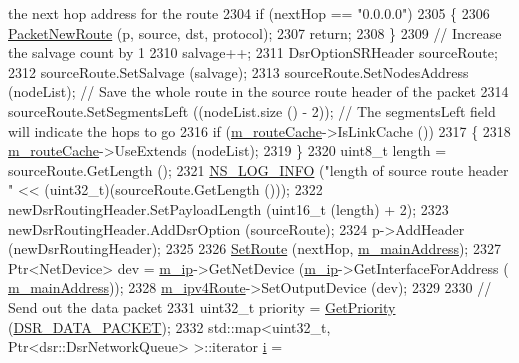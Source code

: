 \begin{DoxyCode}
{       the next hop address for the route}
2304       \textcolor{keywordflow}{if} (nextHop == \textcolor{stringliteral}{"0.0.0.0"})
2305         \{
2306           \hyperlink{classns3_1_1dsr_1_1DsrRouting_ae70ab39db551d1d81afc081196f78017}{PacketNewRoute} (p, source, dst, protocol);
2307           \textcolor{keywordflow}{return};
2308         \}
2309       \textcolor{comment}{// Increase the salvage count by 1}
2310       salvage++;
2311       DsrOptionSRHeader sourceRoute;
2312       sourceRoute.SetSalvage (salvage);
2313       sourceRoute.SetNodesAddress (nodeList);     \textcolor{comment}{// Save the whole route in the source route header of the
       packet}
2314       sourceRoute.SetSegmentsLeft ((nodeList.size () - 2));     \textcolor{comment}{// The segmentsLeft field will indicate the
       hops to go}
2316 \textcolor{comment}{}      \textcolor{keywordflow}{if} (\hyperlink{classns3_1_1dsr_1_1DsrRouting_ac409bdb961b9fff0fb63ebd026be99ad}{m\_routeCache}->IsLinkCache ())
2317         \{
2318           \hyperlink{classns3_1_1dsr_1_1DsrRouting_ac409bdb961b9fff0fb63ebd026be99ad}{m\_routeCache}->UseExtends (nodeList);
2319         \}
2320       uint8\_t length = sourceRoute.GetLength ();
2321       \hyperlink{group__logging_gafbd73ee2cf9f26b319f49086d8e860fb}{NS\_LOG\_INFO} (\textcolor{stringliteral}{"length of source route header "} << (uint32\_t)(sourceRoute.GetLength ()));
2322       newDsrRoutingHeader.SetPayloadLength (uint16\_t (length) + 2);
2323       newDsrRoutingHeader.AddDsrOption (sourceRoute);
2324       p->AddHeader (newDsrRoutingHeader);
2325 
2326       \hyperlink{classns3_1_1dsr_1_1DsrRouting_a8a726fb52558a1a8172a5bd5b8cdb072}{SetRoute} (nextHop, \hyperlink{classns3_1_1dsr_1_1DsrRouting_a73182b5edee2d8460f28855e058fc9a0}{m\_mainAddress});
2327       Ptr<NetDevice> dev = \hyperlink{classns3_1_1dsr_1_1DsrRouting_a0443d48172143cafa1d0491e35f3fbaf}{m\_ip}->GetNetDevice (\hyperlink{classns3_1_1dsr_1_1DsrRouting_a0443d48172143cafa1d0491e35f3fbaf}{m\_ip}->GetInterfaceForAddress (
      \hyperlink{classns3_1_1dsr_1_1DsrRouting_a73182b5edee2d8460f28855e058fc9a0}{m\_mainAddress}));
2328       \hyperlink{classns3_1_1dsr_1_1DsrRouting_ab4c16d56044159989e52ad33c0afed2b}{m\_ipv4Route}->SetOutputDevice (dev);
2329 
2330       \textcolor{comment}{// Send out the data packet}
2331       uint32\_t priority = \hyperlink{classns3_1_1dsr_1_1DsrRouting_a67d111b0188b6e2210d1b4782820f8e3}{GetPriority} (\hyperlink{namespacens3_1_1dsr_a7c80bcec67d78dc149a0e503014d07c5ad29c69f5a6ad5fbb5eec5524f553e315}{DSR\_DATA\_PACKET});
2332       std::map<uint32\_t, Ptr<dsr::DsrNetworkQueue> >::iterator \hyperlink{bernuolliDistribution_8m_a6f6ccfcf58b31cb6412107d9d5281426}{i} = 

\end{DoxyCode}
